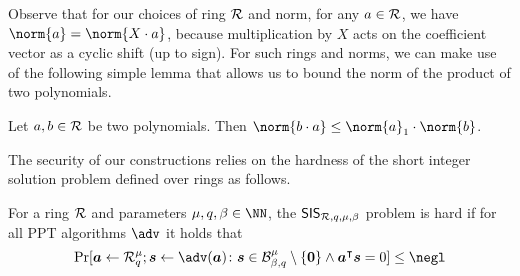 Observe that for our choices of ring $\mathcal{R}$ and norm, for any $a\in\mathcal{R}$, we have $\norm{a} = \norm{X\cdot a}$, because multiplication by $X$ acts on the coefficient vector as a cyclic shift (up to sign).
For such rings and norms, we can make use of the following simple lemma that allows us to bound the norm of the product of two polynomials.
\begin{lemma}\label{lem:ternbound}
  Let $a,b\in\mathcal{R}$ be two polynomials. Then $\norm{b\cdot a} \leq \norm{a}_1\cdot\norm{b}$.
\end{lemma}

The security of our constructions relies on the hardness of the short integer solution problem defined over rings as follows.
\begin{definition}\label{def:ring-sis}
  For a ring $\mathcal{R}$ and parameters $\mu,q,\beta \in \NN$, the $\mathsf{SIS}_{\mathcal{R},q,\mu,\beta}$ problem is hard if for all PPT algorithms $\adv$ it holds that
  \[
    \Pr[
      \vec{a} \gets \ring_q^\mu; \vec{s}\gets\adv(\vec{a}) \colon \vec{s}\in\ball{\beta}{q}^\mu\setminus\{\vec{0}\} \land \vec{a}^\transpose\vec{s}=0
    ] \leq \negl
  \]
\end{definition}

